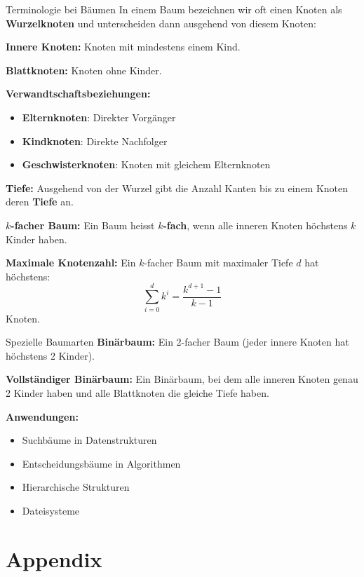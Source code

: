 \documentclass[a4paper, fontsize=7pt]{scrartcl}
\begin{document}
\begin{mainbox}{Terminologie bei B\"aumen}
In einem Baum bezeichnen wir oft einen Knoten als \textbf{Wurzelknoten} und unterscheiden dann ausgehend von diesem Knoten:

\textbf{Innere Knoten:}
Knoten mit mindestens einem Kind.

\textbf{Blattknoten:}
Knoten ohne Kinder.

\textbf{Verwandtschaftsbeziehungen:}
\begin{itemize}
    \item \textbf{Elternknoten}: Direkter Vorg\"anger
    \item \textbf{Kindknoten}: Direkte Nachfolger
    \item \textbf{Geschwisterknoten}: Knoten mit gleichem Elternknoten
\end{itemize}

\textbf{Tiefe:}
Ausgehend von der Wurzel gibt die Anzahl Kanten bis zu einem Knoten deren \textbf{Tiefe} an.

\textbf{$k$-facher Baum:}
Ein Baum heisst \textbf{$k$-fach}, wenn alle inneren Knoten h\"ochstens $k$ Kinder haben.

\textbf{Maximale Knotenzahl:}
Ein $k$-facher Baum mit maximaler Tiefe $d$ hat h\"ochstens:
$$\sum_{i=0}^{d} k^i = \frac{k^{d+1} - 1}{k - 1}$$
Knoten.
\end{mainbox}

\begin{subbox}{Spezielle Baumarten}
\textbf{Bin\"arbaum:}
Ein 2-facher Baum (jeder innere Knoten hat h\"ochstens 2 Kinder).

\textbf{Vollst\"andiger Bin\"arbaum:}
Ein Bin\"arbaum, bei dem alle inneren Knoten genau 2 Kinder haben und alle Blattknoten die gleiche Tiefe haben.

\textbf{Anwendungen:}
\begin{itemize}
    \item Suchb\"aume in Datenstrukturen
    \item Entscheidungsb\"aume in Algorithmen
    \item Hierarchische Strukturen
    \item Dateisysteme
\end{itemize}
\end{subbox}

\section{Appendix}
\end{document}
